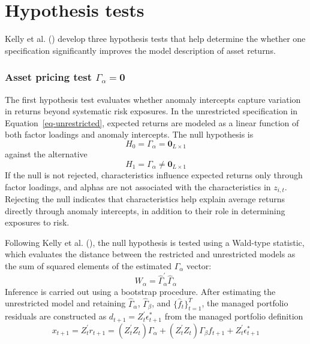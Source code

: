 \documentclass[
  12pt,
  a4paper,
  openany]{scrbook}
\begin{document}
\section{Hypothesis tests}\label{hypothesis-tests}

Kelly et al. () develop
three hypothesis tests that help determine the whether one specification
significantly improves the model description of asset returns.

\subsubsection{\texorpdfstring{Asset pricing test
\(\Gamma_\alpha = \mathbf{0}\)}{Asset pricing test \textbackslash Gamma\_\textbackslash alpha = \textbackslash mathbf\{0\}}}\label{asset-pricing-test-gamma_alpha-mathbf0}

The first hypothesis test evaluates whether anomaly intercepts capture
variation in returns beyond systematic risk exposures. In the
unrestricted specification in Equation~\ref{eq-unrestricted}, expected
returns are modeled as a linear function of both factor loadings and
anomaly intercepts. The null hypothesis is \[
H_0 = \Gamma_\alpha = \mathbf{0}_{L \times 1}
\] against the alternative \[
H_1 = \Gamma_\alpha \neq \mathbf{0}_{L \times 1}
\] If the null is not rejected, characteristics influence expected
returns only through factor loadings, and alphas are not associated with
the characteristics in \(z_{i,t}\). Rejecting the null indicates that
characteristics help explain average returns directly through anomaly
intercepts, in addition to their role in determining exposures to risk.

Following Kelly et al.
(), the null hypothesis
is tested using a Wald-type statistic, which evaluates the distance
between the restricted and unrestricted models as the sum of squared
elements of the estimated \(\Gamma_\alpha\) vector:
\[W_\alpha = \hat\Gamma^{\prime}_\alpha\hat\Gamma_\alpha\] Inference is
carried out using a bootstrap procedure. After estimating the
unrestricted model and retaining \(\hat\Gamma_\alpha\),
\(\hat\Gamma_\beta\), and \({\{\hat f_t}\}_{t=1}^T\), the managed
portfolio residuals are constructed as
\(d_{t+1} = Z_t^\prime \epsilon^*_{t+1}\) from the managed portfolio
definition \[
x_{t+1} = Z_t^\prime r_{t+1} = (Z_t^\prime Z_t)\Gamma_\alpha + (Z_t^\prime Z_t)\Gamma_\beta f_{t+1} + Z_t^\prime \epsilon^*_{t+1}
\]
\end{document}
